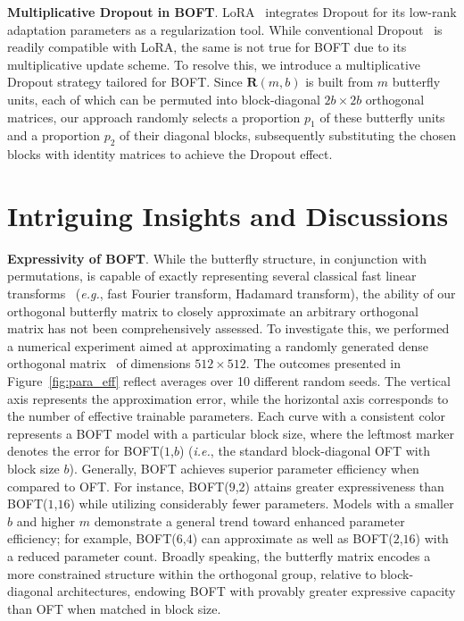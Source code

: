 \textbf{Multiplicative Dropout in BOFT}. LoRA~\cite{hulora2022} integrates Dropout for its low-rank adaptation parameters as a regularization tool. While conventional Dropout~\cite{srivastava2014dropout} is readily compatible with LoRA, the same is not true for BOFT due to its multiplicative update scheme. To resolve this, we introduce a multiplicative Dropout strategy tailored for BOFT. Since $\bm{R}(m,b)$ is built from $m$ butterfly units, each of which can be permuted into block-diagonal $2b\times 2b$ orthogonal matrices, our approach randomly selects a proportion $p_1$ of these butterfly units and a proportion $p_2$ of their diagonal blocks, subsequently substituting the chosen blocks with identity matrices to achieve the Dropout effect.

\section{Intriguing Insights and Discussions}

\textbf{Expressivity of BOFT}. While the butterfly structure, in conjunction with permutations, is capable of exactly representing several classical fast linear transforms~\cite{dao2019learning,dao2019kaleidoscope} (\emph{e.g.}, fast Fourier transform, Hadamard transform), the ability of our orthogonal butterfly matrix to closely approximate an arbitrary orthogonal matrix has not been comprehensively assessed. To investigate this, we performed a numerical experiment aimed at approximating a randomly generated dense orthogonal matrix~\cite{anderson1987generation} of dimensions $512\times 512$. The outcomes presented in Figure~\ref{fig:para_eff} reflect averages over 10 different random seeds. The vertical axis represents the approximation error, while the horizontal axis corresponds to the number of effective trainable parameters. Each curve with a consistent color represents a BOFT model with a particular block size, where the leftmost marker denotes the error for BOFT($1$,$b$) (\emph{i.e.}, the standard block-diagonal OFT with block size $b$). Generally, BOFT achieves superior parameter efficiency when compared to OFT. For instance, BOFT($9$,$2$) attains greater expressiveness than BOFT($1$,$16$) while utilizing considerably fewer parameters. Models with a smaller $b$ and higher $m$ demonstrate a general trend toward enhanced parameter efficiency; for example, BOFT($6$,$4$) can approximate as well as BOFT($2$,$16$) with a reduced parameter count. Broadly speaking, the butterfly matrix encodes a more constrained structure within the orthogonal group, relative to block-diagonal architectures, endowing BOFT with provably greater expressive capacity than OFT when matched in block size.


